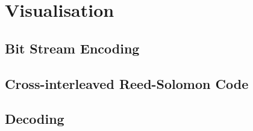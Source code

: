 \chapter{Visualisation}
\section{Bit Stream Encoding}
\section{Cross-interleaved Reed-Solomon Code}
\section{Decoding}
